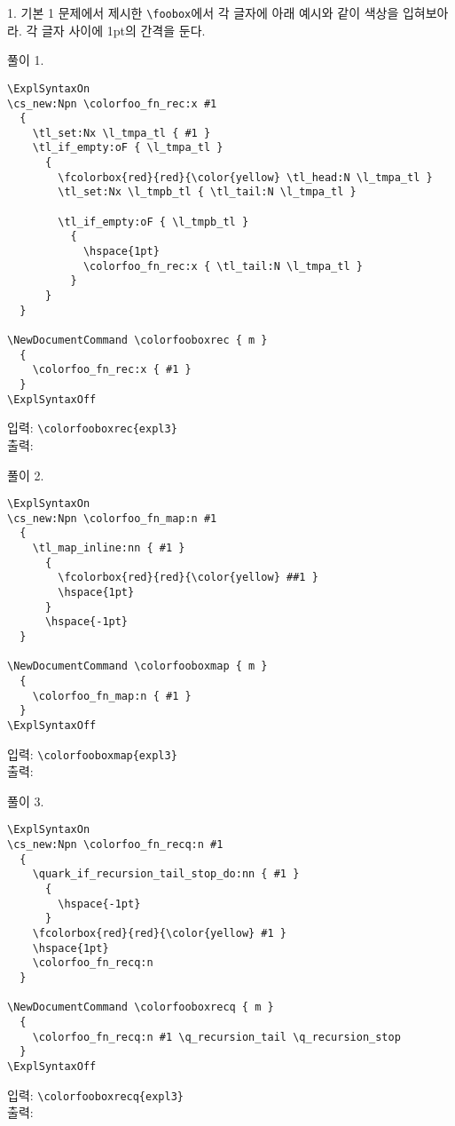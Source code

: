 \documentclass[a4paper,amsmath,itemph]{oblivoir}
\begin{document}
\begin{questionp}{1. 기본 1}
  문제에서 제시한 \verb|\foobox|에서 각 글자에 아래 예시와 같이 색상을
  입혀보아라.
  각 글자 사이에 1pt의 간격을 둔다.

  \tcblower

  풀이 1.
  \begin{verbatim}
\ExplSyntaxOn
\cs_new:Npn \colorfoo_fn_rec:x #1
  {
    \tl_set:Nx \l_tmpa_tl { #1 }
    \tl_if_empty:oF { \l_tmpa_tl }
      {
        \fcolorbox{red}{red}{\color{yellow} \tl_head:N \l_tmpa_tl }
        \tl_set:Nx \l_tmpb_tl { \tl_tail:N \l_tmpa_tl }

        \tl_if_empty:oF { \l_tmpb_tl }
          {
            \hspace{1pt}
            \colorfoo_fn_rec:x { \tl_tail:N \l_tmpa_tl }
          }
      }
  }

\NewDocumentCommand \colorfooboxrec { m }
  {
    \colorfoo_fn_rec:x { #1 }
  }
\ExplSyntaxOff
  \end{verbatim}

  \begin{tcolorbox}{}
    입력: \verb|\colorfooboxrec{expl3}|\\
    출력: 
  \end{tcolorbox}

  풀이 2.
  \begin{verbatim}
\ExplSyntaxOn
\cs_new:Npn \colorfoo_fn_map:n #1
  {
    \tl_map_inline:nn { #1 }
      {
        \fcolorbox{red}{red}{\color{yellow} ##1 }
        \hspace{1pt}
      }
      \hspace{-1pt}
  }

\NewDocumentCommand \colorfooboxmap { m }
  {
    \colorfoo_fn_map:n { #1 }
  }
\ExplSyntaxOff
  \end{verbatim}

  \begin{tcolorbox}{}
    입력: \verb|\colorfooboxmap{expl3}|\\
    출력: 
  \end{tcolorbox}

  풀이 3.
  \begin{verbatim}
\ExplSyntaxOn
\cs_new:Npn \colorfoo_fn_recq:n #1
  {
    \quark_if_recursion_tail_stop_do:nn { #1 }
      {
        \hspace{-1pt}
      }
    \fcolorbox{red}{red}{\color{yellow} #1 }
    \hspace{1pt}
    \colorfoo_fn_recq:n
  }

\NewDocumentCommand \colorfooboxrecq { m }
  {
    \colorfoo_fn_recq:n #1 \q_recursion_tail \q_recursion_stop
  }
\ExplSyntaxOff
  \end{verbatim}

  \begin{tcolorbox}{}
    입력: \verb|\colorfooboxrecq{expl3}|\\
    출력: 
  \end{tcolorbox}
\end{questionp}
\end{document}
